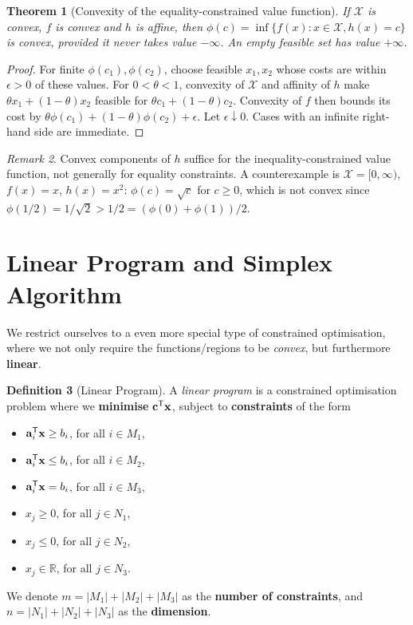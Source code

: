 \documentclass[11pt]{article}
\newtheorem{theorem}{Theorem}[section]
\theoremstyle{definition}
\newtheorem{definition}[theorem]{Definition}
\theoremstyle{remark}
\newtheorem{remark}[theorem]{Remark}
\newcommand{\abs}[1]{\left|#1\right|}
\newcommand{\RR}{\mathbb{R}}
\newcommand{\transpose}{^{\mathsf{T}}}
\begin{document}
\begin{theorem}[Convexity of the equality-constrained value function]\label{optim-unit-0039}
If \(\mathcal X\) is convex, \(f\) is convex and \(h\) is affine, then
\(\phi(c)=\inf\{f(x):x\in\mathcal X,h(x)=c\}\) is convex, provided it never takes
value \(-\infty\). An empty feasible set has value \(+\infty\).
\end{theorem}
\begin{proof}
For finite \(\phi(c_1),\phi(c_2)\), choose feasible \(x_1,x_2\) whose costs are
within \(\epsilon>0\) of these values. For \(0<\theta<1\), convexity of \(\mathcal X\)
and affinity of \(h\) make \(\theta x_1+(1-\theta)x_2\) feasible for
\(\theta c_1+(1-\theta)c_2\). Convexity of \(f\) then bounds its cost by
\(\theta\phi(c_1)+(1-\theta)\phi(c_2)+\epsilon\). Let \(\epsilon\downarrow0\).
Cases with an infinite right-hand side are immediate.
\end{proof}
\begin{remark}\label{optim-unit-0040}
Convex components of \(h\) suffice for the inequality-constrained value function,
not generally for equality constraints. A counterexample is \(\mathcal X=[0,\infty)\), \(f(x)=x\), \(h(x)=x^2\):
\(\phi(c)=\sqrt c\) for \(c\ge0\), which is not convex since
\(\phi(1/2)=1/\sqrt2>1/2=(\phi(0)+\phi(1))/2\).
\end{remark}
\section{Linear Program and Simplex Algorithm}

We restrict ourselves to a even more special type of constrained optimisation, where we not only require the functions/regions to be \emph{convex}, but furthermore \textbf{linear}.

\begin{definition}[Linear Program]\label{optim-unit-0041}
    A \emph{linear program} is a constrained optimisation problem where we \textbf{minimise} \(\vb{c}\transpose \vb{x}\), subject to \textbf{constraints} of the form
    \begin{itemize}
        \item \(\vb{a}_i\transpose \vb{x} \geq b_i\), for all \(i \in M_1\),
        \item \(\vb{a}_i\transpose \vb{x} \leq b_i\), for all \(i \in M_2\),
        \item \(\vb{a}_i\transpose \vb{x} = b_i\), for all \(i \in M_3\),
        \item \(x_j \geq 0\), for all \(j \in N_1\),
        \item \(x_j \leq 0\), for all \(j \in N_2\),
        \item \(x_j \in \RR\), for all \(j \in N_3\).
    \end{itemize}

    We denote \(m = \abs{M_1} + \abs{M_2} + \abs{M_3}\) as the \textbf{number of constraints}, and \(n = \abs{N_1} + \abs{N_2} + \abs{N_3}\) as the \textbf{dimension}.
\end{definition}
\end{document}
